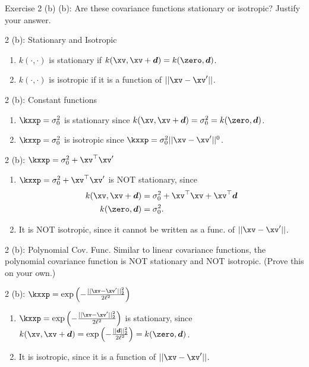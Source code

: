 \documentclass[aspectratio=169]{beamer}
\newcommand{\xvp}{\xv^\prime}
\newcommand{\dv}{\bm{d}}
\begin{document}
\begin{frame}{Exercise 2 (b)}
	(b): Are these covariance functions stationary or isotropic? Justify your answer.
\end{frame}

\begin{frame}{2 (b): Stationary and Isotropic}
	\begin{enumerate}
		\item $k(\cdot, \cdot)$ is stationary if $k(\xv, \xv + \dv) = k(\zero, \dv)$.
		\item $k(\cdot, \cdot)$ is isotropic if it is a function of $||\xv - \xvp||$.
	\end{enumerate}
\end{frame}

\begin{frame}{2 (b): Constant functions}
	\begin{enumerate}
		\item $\kxxp = \sigma_0^2$ is stationary since $k(\xv, \xv + \dv) = \sigma_0^2  = k(\zero, \dv)$.
		\item $\kxxp = \sigma_0^2$ is isotropic since $ \kxxp = \sigma_0^2||\xv - \xvp ||^0$.
	\end{enumerate}
\end{frame}

\begin{frame}{2 (b): $\kxxp = \sigma_0^2 + \xv^\top \xvp$}
	\begin{enumerate}
		\item $\kxxp = \sigma_0^2 + \xv^\top \xvp$ is NOT stationary, since
		\begin{align*}
			k(\xv, \xv + \dv) &= \sigma_0^2 + \xv^\top \xv + \xv^\top \dv \\
			k(\zero, \dv) &= \sigma_0^2.
		\end{align*}
		\item It is NOT isotropic, since it cannot be written as a func. of $|| \xv - \xvp||$.
	\end{enumerate}
\end{frame}

\begin{frame}{2 (b): Polynomial Cov. Func.}
	Similar to linear covariance functions, the polynomial covariance function is NOT stationary and NOT isotropic. (Prove this on your own.)
\end{frame}

\begin{frame}{2 (b): $\kxxp = \exp\left( - \frac{||\xv - \xvp||_2^2}{2 \ell^2}\right)$}
	\begin{enumerate}
		\item $\kxxp = \exp\left( - \frac{||\xv - \xvp||_2^2}{2 \ell^2}\right)$ is stationary, since $k(\xv, \xv + \dv) = \exp \left( - \frac{||\dv||_2^2}{2 \ell^2} \right) = k(\zero, \dv)$.
		\item It is isotropic, since it is a function of $||\xv - \xvp||$.
	\end{enumerate}
\end{frame}
\end{document}
